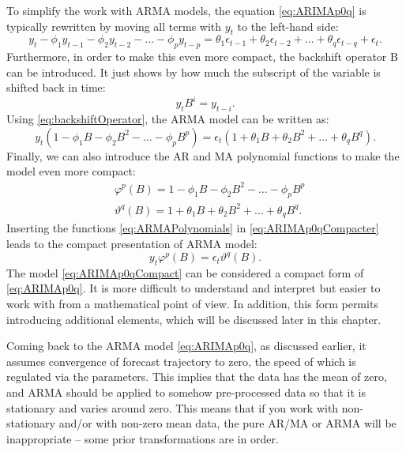 \documentclass[]{book}
\theoremstyle{definition}
\theoremstyle{definition}
\theoremstyle{definition}
\theoremstyle{definition}
\theoremstyle{remark}
\begin{document}
To simplify the work with ARMA models, the equation \eqref{eq:ARIMAp0q} is typically rewritten by moving all terms with \(y_t\) to the left-hand side:
\begin{equation}
  {y}_{t} -\phi_1 y_{t-1} -\phi_2 y_{t-2} -\dots -\phi_p y_{t-p} = \theta_1 \epsilon_{t-1} + \theta_2 \epsilon_{t-2} + \dots + \theta_q \epsilon_{t-q} + \epsilon_t .
  \label{eq:ARIMAp0qLeft}
\end{equation}
Furthermore, in order to make this even more compact, the backshift operator B can be introduced. It just shows by how much the subscript of the variable is shifted back in time:
\begin{equation}
  {y}_{t} B^i = {y}_{t-i}.
  \label{eq:backshiftOperator}
\end{equation}
Using \eqref{eq:backshiftOperator}, the ARMA model can be written as:
\begin{equation}
  {y}_{t} (1 -\phi_1 B -\phi_2 B^2 -\dots -\phi_p B^p) = \epsilon_t (1 + \theta_1 B + \theta_2 B^2 + \dots + \theta_q B^q) .
  \label{eq:ARIMAp0qCompacter}
\end{equation}
Finally, we can also introduce the AR and MA polynomial functions to make the model even more compact:
\begin{equation}
\begin{aligned}
  & \varphi^p(B) = 1 -\phi_1 B -\phi_2 B^2 -\dots -\phi_p B^p \\ 
  & \vartheta^q(B) = 1 + \theta_1 B + \theta_2 B^2 + \dots + \theta_q B^q .
\end{aligned}
  \label{eq:ARMAPolynomials}
\end{equation}
Inserting the functions \eqref{eq:ARMAPolynomials} in \eqref{eq:ARIMAp0qCompacter} leads to the compact presentation of ARMA model:
\begin{equation}
  {y}_{t} \varphi^p(B) = \epsilon_t \vartheta^q(B) .
  \label{eq:ARIMAp0qCompact}
\end{equation}
The model \eqref{eq:ARIMAp0qCompact} can be considered a compact form of \eqref{eq:ARIMAp0q}. It is more difficult to understand and interpret but easier to work with from a mathematical point of view. In addition, this form permits introducing additional elements, which will be discussed later in this chapter.

Coming back to the ARMA model \eqref{eq:ARIMAp0q}, as discussed earlier, it assumes convergence of forecast trajectory to zero, the speed of which is regulated via the parameters. This implies that the data has the mean of zero, and ARMA should be applied to somehow pre-processed data so that it is stationary and varies around zero. This means that if you work with non-stationary and/or with non-zero mean data, the pure AR/MA or ARMA will be inappropriate -- some prior transformations are in order.
\end{document}

